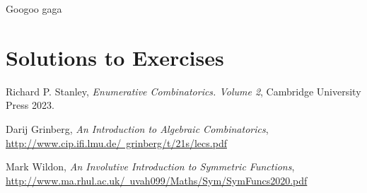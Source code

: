 \documentclass{article}
\begin{document}
\begin{theorem}
    Googoo gaga
\end{theorem}

\section{Solutions to Exercises}

\begin{exercise}
\end{exercise}

\begin{thebibliography}{999999}
    \raggedright\footnotesize

    Richard P. Stanley, \textit{Enumerative Combinatorics. Volume 2}, Cambridge University Press 2023.

    Darij Grinberg, \textit{An Introduction to Algebraic Combinatorics}, \href{http://www.cip.ifi.lmu.de/~grinberg/t/21s/lecs.pdf}{http://www.cip.ifi.lmu.de/~grinberg/t/21s/lecs.pdf}

    Mark Wildon, \textit{An Involutive Introduction to Symmetric Functions}, \href{http://www.ma.rhul.ac.uk/~uvah099/Maths/Sym/SymFuncs2020.pdf}{http://www.ma.rhul.ac.uk/~uvah099/Maths/Sym/SymFuncs2020.pdf}
\end{thebibliography}
\end{document}
